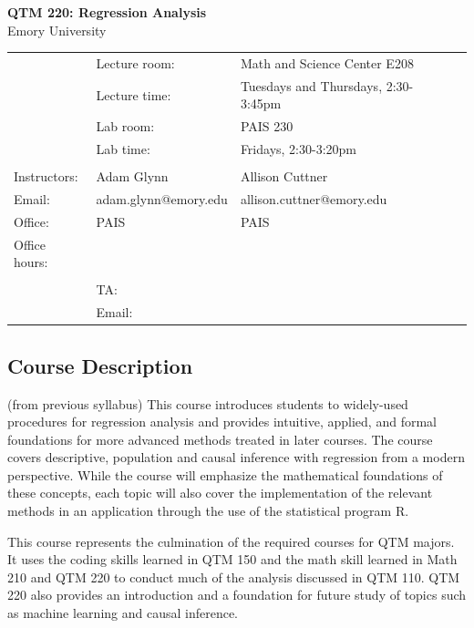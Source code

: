 \documentclass[12pt]{article}
\begin{document}
			\thispagestyle{fancy}
				
			
			
				\begin{center}
				{\large \textbf{QTM 220: Regression Analysis } }\\
				\vspace{0.1in}
				Emory University\\
				\vspace{0.2in}
				\begin{tabular}{llll}
				&	Lecture room:   & Math and Science Center E208  &\\
					& Lecture time:   & Tuesdays and Thursdays, 2:30-3:45pm & \\
					& Lab room: & PAIS 230 & \\
				& 	Lab time: & Fridays, 2:30-3:20pm & \\
					\\
					Instructors:     & Adam Glynn  &  Allison Cuttner  \\
					Email: & adam.glynn@emory.edu  &  allison.cuttner@emory.edu \\
					Office: & PAIS  & PAIS \\
					Office hours: &  & & \\
					\\
					& TA: & & \\
				& 	Email: & & \\
					
				\end{tabular}
			\end{center}
			
			
			\subsection*{Course Description}
(from previous syllabus) This course introduces students to widely-used procedures for regression analysis and provides intuitive, applied, and formal foundations for more advanced methods treated in later courses. The course covers descriptive, population and causal inference with regression from a modern perspective. While the course will emphasize the mathematical foundations of these concepts, each topic will also cover the implementation of the relevant methods in an application through the use of the statistical program R.

This course represents the culmination of the required courses for QTM majors. It uses the coding skills learned in QTM 150 and the math skill learned in Math 210 and QTM 220 to conduct much of the analysis discussed in QTM 110. QTM 220 also provides an introduction and a foundation for future study  of topics such as machine learning and causal inference. 
\end{document}
